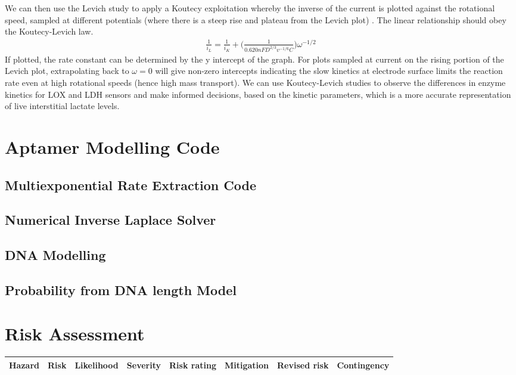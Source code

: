 \begin{appendices}
We can then use the Levich study to apply a Koutecy exploitation whereby the inverse of the current is plotted against the rotational speed, sampled at different potentials (where there is a steep rise and plateau from the Levich plot) \cite{nikolic2000theoretical}. The linear relationship should obey the Koutecy-Levich law. 
\begin{align}
    \frac{1}{i_{L}} = \frac{1}{i_{K}}+\bigg(\frac{1}{0.620nFD^{2/3}v^{-1/6}C}\bigg)\omega^{-1/2}
\end{align}
If plotted, the rate constant can be determined by the y intercept of the graph.
For plots sampled at current on the rising portion of the Levich plot, extrapolating back to $\omega=0$ will give non-zero intercepts indicating the slow kinetics at electrode surface limits the reaction rate even at high rotational speeds (hence high mass transport). 
We can use Koutecy-Levich studies to observe the differences in enzyme kinetics for LOX and LDH sensors and make informed decisions, based on the kinetic parameters, which is a more accurate representation of live interstitial lactate levels.
\newpage
\section{Aptamer Modelling Code} \label{app:apt_mod}
\subsection{Multiexponential Rate Extraction Code}

\newpage
\subsection{Numerical Inverse Laplace Solver}

\newpage
\subsection{DNA Modelling}

\newpage
\subsection{Probability from DNA length Model}

\newpage

\section{Risk Assessment}
    \begin{longtable}{|p{}|p{}|p{}|p{}|p{}|p{}|p{}|p{}|}\hline
        \textbf{Hazard} & \textbf{Risk} & \textbf{Likelihood} & \textbf{Severity} & \textbf{Risk rating} & \textbf{Mitigation} & \textbf{Revised risk} & \textbf{Contingency }\\ \hline
        

\end{longtable}
\end{appendices}
